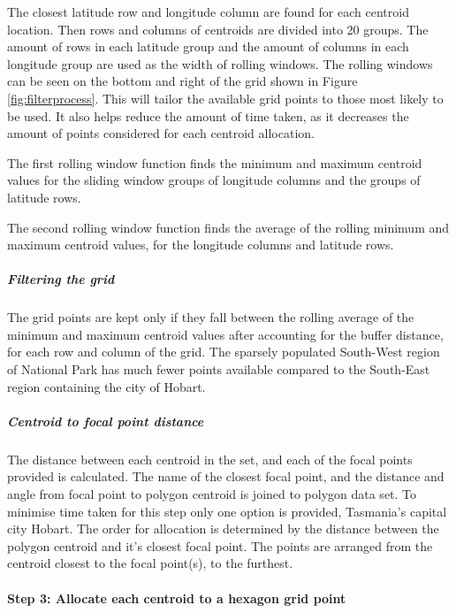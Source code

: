 The closest latitude row and longitude column are found for each
centroid location. Then rows and columns of centroids are divided into
20 groups. The amount of rows in each latitude group and the amount of
columns in each longitude group are used as the width of rolling
windows. The rolling windows can be seen on the bottom and right of the
grid shown in Figure \ref{fig:filterprocess}. This will tailor the
available grid points to those most likely to be used. It also helps
reduce the amount of time taken, as it decreases the amount of points
considered for each centroid allocation.

The first rolling window function finds the minimum and maximum centroid
values for the sliding window groups of longitude columns and the groups
of latitude rows.

The second rolling window function finds the average of the rolling
minimum and maximum centroid values, for the longitude columns and
latitude rows.

\hypertarget{filtering-the-grid}{%
\subparagraph{Filtering the grid}\label{filtering-the-grid}}

The grid points are kept only if they fall between the rolling average
of the minimum and maximum centroid values after accounting for the
buffer distance, for each row and column of the grid. The sparsely
populated South-West region of National Park has much fewer points
available compared to the South-East region containing the city of
Hobart.

\hypertarget{centroid-to-focal-point-distance}{%
\subparagraph{Centroid to focal point
distance}\label{centroid-to-focal-point-distance}}

The distance between each centroid in the set, and each of the focal
points provided is calculated. The name of the closest focal point, and
the distance and angle from focal point to polygon centroid is joined to
polygon data set. To minimise time taken for this step only one option
is provided, Tasmania's capital city Hobart. The order for allocation is
determined by the distance between the polygon centroid and it's closest
focal point. The points are arranged from the centroid closest to the
focal point(s), to the furthest.

\hypertarget{step-3-allocate-each-centroid-to-a-hexagon-grid-point}{%
\paragraph{Step 3: Allocate each centroid to a hexagon grid
point}\label{step-3-allocate-each-centroid-to-a-hexagon-grid-point}}

